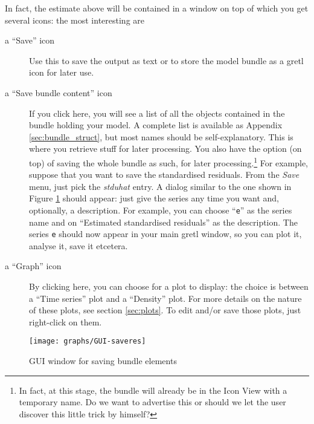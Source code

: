\documentclass[a4paper,11pt]{article}
\newcommand{\app}[1]{\textsf{#1}}
\newcounter{script}[section]
\begin{document}
In fact, the estimate above will be contained in a window on top of
which you get several icons: the most interesting are
\begin{description}
\item[a ``Save'' icon] Use this to save the output as text or to store
  the model bundle as a gretl icon for later use.
\item[a ``Save bundle content'' icon] If you click here, you will see
  a list of all the objects contained in the bundle holding your
  model. A complete list is available as Appendix
  \ref{sec:bundle_struct}, but most names should be
  self-explanatory. This is where you retrieve stuff for later
  processing. You also have the option (on top) of saving the whole
  bundle as such, for later processing.\footnote{In fact, at this
    stage, the bundle will already be in the Icon View with a
    temporary name. Do we want to advertise this or should we let the
    user discover this little trick by himself?} For example, suppose
  that you want to save the standardised residuals. From the
  \emph{Save} menu, just pick the \emph{stduhat} entry. A dialog
  similar to the one shown in Figure \ref{fig:GUI-saveres} should
  appear: just give the series any time you want and, optionally, a
  description. For example, you can choose ``\texttt{e}'' as the
  series name and on ``Estimated standardised residuals'' as the
  description. The series \texttt{e} should now appear in your main
  \app{gretl} window, so you can plot it, analyse it, save it
  etcetera.

\item[a ``Graph'' icon] By clicking here, you can choose for a plot to
  display: the choice is between a ``Time series'' plot and a
  ``Density'' plot. For more details on the nature of these plots, see
  section \ref{sec:plots}. To edit and/or save those plots, just
  right-click on them.
\end{description}

\begin{figure}[htb]
  \centering
  \texttt{[image: graphs/GUI-saveres]}
  \caption{GUI window for saving bundle elements}
  \label{fig:GUI-saveres}
\end{figure}

\end{document}
